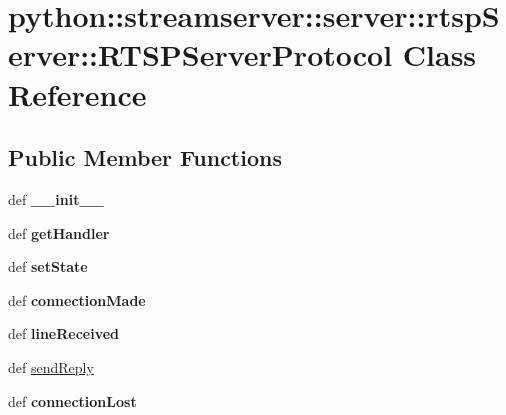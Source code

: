 \hypertarget{classpython_1_1streamserver_1_1server_1_1rtspServer_1_1RTSPServerProtocol}{
\section{python::streamserver::server::rtspServer::RTSPServerProtocol Class Reference}
\label{classpython_1_1streamserver_1_1server_1_1rtspServer_1_1RTSPServerProtocol}
}
\subsection*{Public Member Functions}
\begin{DoxyCompactItemize}
\item 
\hypertarget{classpython_1_1streamserver_1_1server_1_1rtspServer_1_1RTSPServerProtocol_a42c7c7994256469930c0ef10c78d9e73}{
def {\bfseries \_\-\_\-init\_\-\_\-}}
\label{classpython_1_1streamserver_1_1server_1_1rtspServer_1_1RTSPServerProtocol_a42c7c7994256469930c0ef10c78d9e73}

\item 
\hypertarget{classpython_1_1streamserver_1_1server_1_1rtspServer_1_1RTSPServerProtocol_aff15a37bad71c9b095186c8beca58590}{
def {\bfseries getHandler}}
\label{classpython_1_1streamserver_1_1server_1_1rtspServer_1_1RTSPServerProtocol_aff15a37bad71c9b095186c8beca58590}

\item 
\hypertarget{classpython_1_1streamserver_1_1server_1_1rtspServer_1_1RTSPServerProtocol_abf5f5a2714ab2501b5f5e4513dc0c82e}{
def {\bfseries setState}}
\label{classpython_1_1streamserver_1_1server_1_1rtspServer_1_1RTSPServerProtocol_abf5f5a2714ab2501b5f5e4513dc0c82e}

\item 
\hypertarget{classpython_1_1streamserver_1_1server_1_1rtspServer_1_1RTSPServerProtocol_a99bc31a353ce7e303d24032414276b4c}{
def {\bfseries connectionMade}}
\label{classpython_1_1streamserver_1_1server_1_1rtspServer_1_1RTSPServerProtocol_a99bc31a353ce7e303d24032414276b4c}

\item 
\hypertarget{classpython_1_1streamserver_1_1server_1_1rtspServer_1_1RTSPServerProtocol_ac2280676e40fe762624e1fb393adf1fe}{
def {\bfseries lineReceived}}
\label{classpython_1_1streamserver_1_1server_1_1rtspServer_1_1RTSPServerProtocol_ac2280676e40fe762624e1fb393adf1fe}

\item 
def \hyperlink{classpython_1_1streamserver_1_1server_1_1rtspServer_1_1RTSPServerProtocol_acf82de10a5a06d35a836a590c63af9f3}{sendReply}
\item 
\hypertarget{classpython_1_1streamserver_1_1server_1_1rtspServer_1_1RTSPServerProtocol_a9277cd5e5bfaeb345ea4acf63bbbe052}{
def {\bfseries connectionLost}}
\label{classpython_1_1streamserver_1_1server_1_1rtspServer_1_1RTSPServerProtocol_a9277cd5e5bfaeb345ea4acf63bbbe052}

\end{DoxyCompactItemize}
